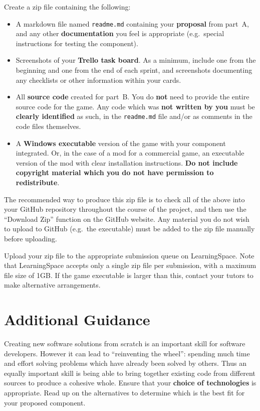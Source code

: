 \documentclass{../fal_assignment}
\begin{document}
Create a zip file containing the following:

\begin{itemize}
\item A markdown file named \texttt{readme.md} containing your \textbf{proposal} from part~A,
    and any other \textbf{documentation} you feel is appropriate
    (e.g.\ special instructions for testing the component).
\item Screenshots of your \textbf{Trello task board}.
    As a minimum, include one from the beginning and one from the end of each sprint,
    and screenshots documenting any checklists or other information within your cards.
\item All \textbf{source code} created for part~B.
    You do \textbf{not} need to provide the entire source code for the game.
    Any code which was \textbf{not written by you} must be \textbf{clearly identified} as such,
    in the \texttt{readme.md} file and/or as comments in the code files themselves.
\item A \textbf{Windows executable} version of the game with your component integrated.
    Or, in the case of a mod for a commercial game, an executable version of the mod with clear installation instructions.
    \textbf{Do not include copyright material which you do not have permission to redistribute}.
\end{itemize}

The recommended way to produce this zip file is to check all of the above into your GitHub repository
throughout the course of the project,
and then use the ``Download Zip'' function on the GitHub website.
Any material you do not wish to upload to GitHub (e.g.\ the executable)
must be added to the zip file manually before uploading.

Upload your zip file to the appropriate submission queue on LearningSpace.
Note that LearningSpace accepts only a single zip file per submission,
with a maximum file size of 1GB.
If the game executable is larger than this, contact your tutors to make alternative arrangements.

\section*{Additional Guidance}

Creating new software solutions from scratch is an important skill for software developers.
However it can lead to ``reinventing the wheel'': spending much time and effort solving problems which have already been solved by others.
Thus an equally important skill is being able to bring together existing code from different sources to produce a cohesive whole.
Ensure that your \textbf{choice of technologies} is appropriate.
Read up on the alternatives to determine which is the best fit for your proposed component.
\end{document}
